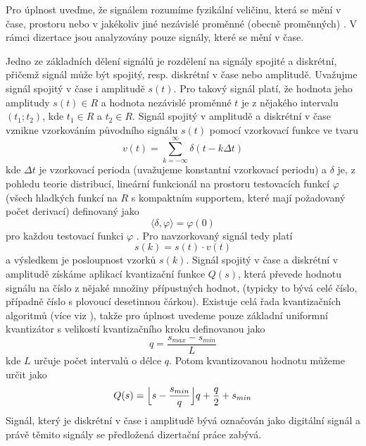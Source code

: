 Pro úplnost uveďme, že signálem rozumíme fyzikální veličinu, která se mění v čase, prostoru nebo v jakékoliv jiné nezávislé proměnné (obecně proměnných) \cite{proakis}. V rámci dizertace jsou analyzovány pouze signály, které se mění v čase.
\par
Jedno ze základních dělení signálů je rozdělení na signály spojité a diskrétní, přičemž signál může být spojitý, resp. diskrétní v čase nebo amplitudě. Uvažujme signál spojitý v čase i amplitudě $s(t)$. Pro takový signál platí, že hodnota jeho amplitudy $s(t)\in R$ a hodnota nezávislé proměnné $t$ je z nějakého intervalu $(t_1;t_2)$, kde $t_1 \in R$ a $t_2 \in R$. Signál spojitý v amplitudě a diskrétní v čase vznikne vzorkováním původního signálu $s(t)$ pomocí vzorkovací funkce ve tvaru
\begin{equation}
v(t)=\sum_{k=-\infty}^{\infty}\delta(t-k\Delta t)
\end{equation}
kde $\Delta t$ je vzorkovací perioda (uvažujeme konstantní vzorkovací periodu) a $\delta$ je, z pohledu teorie distribucí, lineární funkcionál na prostoru testovacích funkcí $\varphi$ (všech hladkých funkcí na $R$ s kompaktním supportem, které mají požadovaný počet derivací) definovaný jako
\begin{equation}
\langle \delta,\varphi\rangle=\varphi(0)
\end{equation}
pro každou testovací funkci $\varphi$ \cite{dirac}. Pro navzorkovaný signál tedy platí
\begin{equation}
s(k)=s(t)\cdot v(t)
\end{equation}
a výsledkem je posloupnost vzorků $s(k)$. Signál spojitý v čase a diskrétní v amplitudě získáme aplikací kvantizační funkce $Q(s)$, která převede hodnotu signálu  na číslo z nějaké množiny přípustných hodnot, (typicky to bývá celé číslo, případně číslo s plovoucí desetinnou čárkou). Existuje celá řada kvantizačních algoritmů (více viz \cite{kvantizace}), takže pro úplnost uvedeme pouze základní uniformní kvantizátor s velikostí kvantizačního kroku definovanou jako
\begin{equation}
q=\frac{s_{max}-s_{min}}{L}
\end{equation}
kde $L$ určuje počet intervalů o délce $q$. Potom kvantizovanou hodnotu můžeme určit jako
\begin{equation}
Q(s)=\Bigl \lfloor s-\frac{s_{min}}{q}\Bigr \rfloor q+\frac{q}{2}+s_{min}
\end{equation}
Signál, který je diskrétní v čase i amplitudě bývá označován jako digitální signál a právě těmito signály se předložená dizertační práce zabývá.

